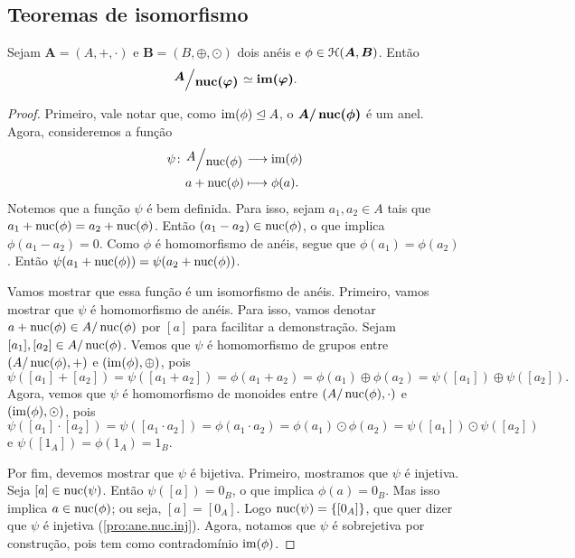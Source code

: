 \subsection{Teoremas de isomorfismo}

\begin{theorem}
\label{teo:iso1}
	Sejam $\bm A=(A,+,\cdot)$ e $\bm B=(B,\oplus,\odot)$ dois anéis e $\phi \in \mathcal{H}(\bm A,\bm B)$. Então
	\begin{equation*}
	\bm{\quo{A}{\nuc(\varphi)}} \simeq \bm{\im(\varphi)}.
	\end{equation*}
\end{theorem}
\begin{proof}
	Primeiro, vale notar que, como $\operatorname{im}(\phi) \mathrel{\unlhd} A$, o $\bm{A/\nuc(\phi)}$ é um anel. Agora, consideremos a função
	\begin{align*}
	\func{\psi}{\quo{A}{\nuc(\phi)}}{\im(\phi)}{a+\nuc(\phi)}{\phi(a).}
	\end{align*}
Notemos que a função $\psi$ é bem definida. Para isso, sejam $a_1,a_2 \in A$ tais que $a_1+\operatorname{nuc}(\phi)=a_2+\operatorname{nuc}(\phi)$. Então $(a_1-a_2) \in \operatorname{nuc}(\phi)$, o que implica $\phi(a_1-a_2)=0$. Como $\phi$ é homomorfismo de anéis, segue que $\phi(a_1)=\phi(a_2)$. Então $\psi(a_1+\operatorname{nuc}(\phi)) = \psi(a_2+\operatorname{nuc}(\phi))$.

	Vamos mostrar que essa função é um isomorfismo de anéis. Primeiro, vamos mostrar que $\psi$ é homomorfismo de anéis. Para isso, vamos denotar $a+\operatorname{nuc}(\phi) \in A/\operatorname{nuc}(\phi)$ por $[a]$ para facilitar a demonstração. Sejam $[a_1],[a_2] \in A/\operatorname{nuc}(\phi)$. Vemos que $\psi$ é homomorfismo de grupos entre $(A/\operatorname{nuc}(\phi),+)$ e $(\operatorname{im}(\phi),\oplus)$, pois
	\begin{equation*}
	\psi([a_1]+[a_2]) = \psi([a_1+a_2]) = \phi(a_1+a_2) = \phi(a_1) \oplus \phi(a_2) = \psi([a_1]) \oplus \psi([a_2]).
	\end{equation*}
Agora, vemos que $\psi$ é homomorfismo de monoides entre $(A/\operatorname{nuc}(\phi),\cdot)$ e $(\operatorname{im}(\phi),\odot)$, pois
	\begin{equation*}
	\psi([a_1] \cdot [a_2]) = \psi([a_1 \cdot a_2]) = \phi(a_1 \cdot a_2) = \phi(a_1) \odot \phi(a_2) = \psi([a_1]) \odot \psi([a_2])
	\end{equation*}
e $\psi([1_A]) = \phi(1_A) = 1_B$.

	Por fim, devemos mostrar que $\psi$ é bijetiva. Primeiro, mostramos que $\psi$ é injetiva. Seja $[a] \in \operatorname{nuc}(\psi)$. Então $\psi([a])=0_B$, o que implica $\phi(a)=0_B$. Mas isso implica $a \in \operatorname{nuc}(\phi)$; ou seja, $[a]=[0_A]$. Logo $\operatorname{nuc}(\psi)=\{[0_A]\}$, que quer dizer que $\psi$ é injetiva (\ref{pro:ane.nuc.inj}). Agora, notamos que $\psi$ é sobrejetiva por construção, pois tem como contradomínio $\operatorname{im}(\phi)$.
\end{proof}

